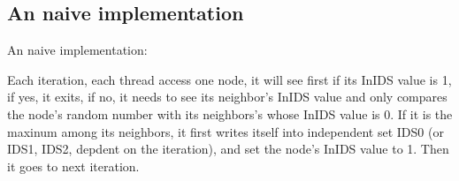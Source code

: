 \documentclass[12pt] {article}
\begin{document}
\subsection{An naive implementation}
An naive implementation: 
\begin{figure}[!tbh]
\centering        
   \caption{ }
   \label{fig:fig1}
\end{figure}

Each iteration, each thread access one node, it will see first if its InIDS value is 1, if yes, it exits, if no, it needs to see its neighbor's InIDS value and only compares the node's random number with its neighbors's whose InIDS value is 0. If it is the maxinum among its neighbors, it first writes itself into independent set IDS0 (or IDS1, IDS2, depdent on the iteration), and set the node's InIDS value to 1. Then it goes to next iteration. 
\end{document}
